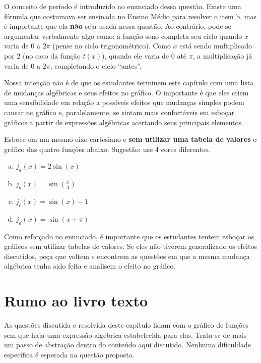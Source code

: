 \documentclass[main_estudante.tex]{subfiles}
\begin{document}
O conceito de período é introduzido no enunciado dessa questão. Existe uma fórmula que costumava ser ensinada no Ensino Médio para resolver o item b, mas é importante que ela \textbf{não} seja usada nessa questão. Ao contrário, pode-se argumentar verbalmente algo como: a função seno completa seu ciclo quando $x$ varia de $0$ a $2\pi$ (pense no ciclo trigonométrico). Como $x$ está sendo multiplicado por $2$ (no caso da função $t(x)$), quando ele varia de $0$ até $\pi$, a multiplicação já varia de $0$ a $2\pi$, completando o ciclo ``antes''.

Nossa intenção não é de que os estudantes terminem este capítulo com uma lista de mudanças algébricas e seus efeitos no gráfico. O importante é que eles criem uma sensibilidade em relação a possíveis efeitos que mudanças simples podem causar no gráfico e, paralelamente, se sintam mais confortáveis em esboçar gráficos a partir de expressões algébricas acertando seus principais elementos.

\begin{questao}
Esboce em um mesmo eixo cartesiano e \textbf{sem utilizar uma tabela de valores} o gráfico das quatro funções abaixo. Sugestão: use 4 cores diferentes.
\begin{enumerate}[a)]
\item $j_a (x)=2\sin(x)$
\item $j_b (x)=\sin(\frac{x}{4})$
\item $j_c (x)=\sin(x)-1$
\item $j_d (x)=\sin(x+\pi)$
\end{enumerate}
\end{questao}

Como reforçado no enunciado, é importante que os estudantes tentem esboçar os gráficos sem utilizar tabelas de valores. Se eles não tiverem generalizado os efeitos discutidos, peça que voltem e encontrem as questões em que a mesma mudança algébrica tenha sido feita e analisem o efeito no gráfico.

\section{Rumo ao livro texto}

As questões discutida e resolvida deste capítulo lidam com o gráfico de funções sem que haja uma expressão algébrica estabelecida para elas. Trata-se de mais um passo de abstração dentro do conteúdo aqui discutido. Nenhuma dificuldade específica é esperada na questão proposta.
\end{document}
